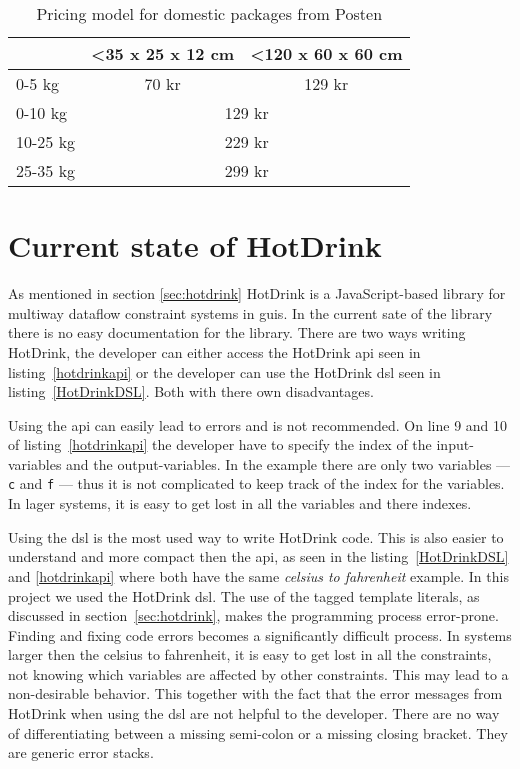 \begin{table}[h]
    \centering
    \caption{Pricing model for domestic packages from Posten}
    \label{pricingmodel}
    \begin{tabular}{|l|cl|}
    \hline
             & \multicolumn{1}{l|}{\textless 35 x 25 x 12 cm} & \textless 120 x 60 x 60 cm  \\ \hline
    0-5 kg   & \multicolumn{1}{c|}{70 kr}                     & \multicolumn{1}{c|}{129 kr} \\ \hline
    0-10 kg  & \multicolumn{2}{c|}{129 kr}                                                  \\ \hline
    10-25 kg & \multicolumn{2}{c|}{229 kr}                                                  \\ \hline
    25-35 kg & \multicolumn{2}{c|}{299 kr}                                                  \\ \hline
    \end{tabular}
\end{table}

\section{Current state of HotDrink}

As mentioned in section \ref{sec:hotdrink} HotDrink is a JavaScript-based library for
multiway dataflow constraint systems in \gls{gui}s. In the current sate of the library 
there is no easy documentation for the library. There are two ways writing HotDrink, 
the developer can either access the HotDrink \gls{api} seen in listing~\ref{hotdrinkapi} 
or the developer can use the HotDrink \gls{dsl} seen in listing~\ref{HotDrinkDSL}. Both 
with there own disadvantages.

Using the \gls{api} can easily lead to errors and is not recommended. On line 9 and 10 
of listing~\ref{hotdrinkapi} the developer have to specify the index of the 
input-variables and the output-variables. In the example there are only two variables 
--- \texttt{c} and \texttt{f} --- thus it is not complicated to keep track of the index 
for the variables. In lager systems, it is easy to get lost in all the variables and 
there indexes.

Using the \gls{dsl} is the most used way to write HotDrink code. This is also easier to 
understand and more compact then the \gls{api}, as seen in the listing~\ref{HotDrinkDSL} 
and \ref{hotdrinkapi} where both have the same \textit{celsius to fahrenheit} example. In 
this project we used the HotDrink \gls{dsl}. The use of the tagged template literals, as 
discussed in section~\ref{sec:hotdrink}, makes the programming process error-prone. 
Finding and fixing code errors becomes a significantly difficult process. In systems 
larger then the celsius to fahrenheit, it is easy to get lost in all the constraints, 
not knowing which variables are affected by other constraints. This may lead to a 
non-desirable behavior.
This together with the fact that the error messages from HotDrink when using 
the \gls{dsl} are not helpful to the developer. There are no way of differentiating 
between a missing semi-colon or a missing closing bracket. They are generic error 
stacks. 

